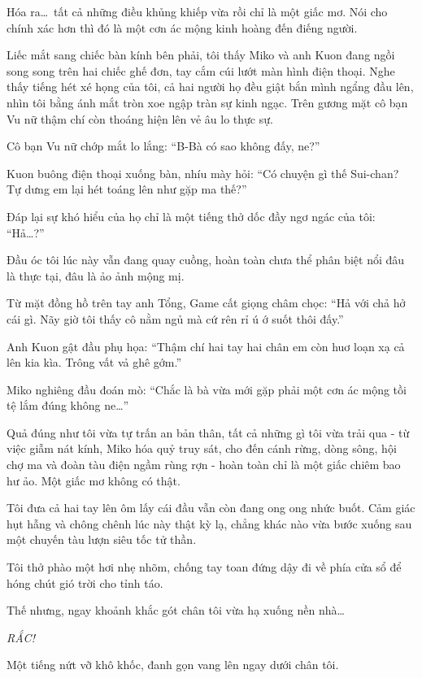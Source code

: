 \documentclass[../main.tex]{subfiles}
\begin{document}
Hóa ra\dots\ tất cả những điều khủng khiếp vừa rồi chỉ là một giấc mơ. Nói cho chính xác hơn thì đó là một cơn ác mộng kinh hoàng đến điếng người.

Liếc mắt sang chiếc bàn kính bên phải, tôi thấy Miko và anh Kuon đang ngồi song song trên hai chiếc ghế đơn, tay cắm cúi lướt màn hình điện thoại. Nghe thấy tiếng hét xé họng của tôi, cả hai người họ đều giật bắn mình ngẩng đầu lên, nhìn tôi bằng ánh mắt tròn xoe ngập tràn sự kinh ngạc. Trên gương mặt cô bạn Vu nữ thậm chí còn thoáng hiện lên vẻ âu lo thực sự.

Cô bạn Vu nữ chớp mắt lo lắng: ``B-Bà có sao không đấy, ne?''


Kuon buông điện thoại xuống bàn, nhíu mày hỏi: ``Có chuyện gì thế Sui-chan? Tự dưng em lại hét toáng lên như gặp ma thế?''

Đáp lại sự khó hiểu của họ chỉ là một tiếng thở dốc đầy ngơ ngác của tôi: ``Hả\dots?''

Đầu óc tôi lúc này vẫn đang quay cuồng, hoàn toàn chưa thể phân biệt nổi đâu là thực tại, đâu là ảo ảnh mộng mị.

Từ mặt đồng hồ trên tay anh Tổng, Game cất giọng châm chọc: ``Hả với chả hở cái gì. Nãy giờ tôi thấy cô nằm ngủ mà cứ rên rỉ ú ớ suốt thôi đấy.''

Anh Kuon gật đầu phụ họa: ``Thậm chí hai tay hai chân em còn huơ loạn xạ cả lên kia kìa. Trông vất vả ghê gớm.''

Miko nghiêng đầu đoán mò: ``Chắc là bà vừa mới gặp phải một cơn ác mộng tồi tệ lắm đúng không ne\dots''

Quả đúng như tôi vừa tự trấn an bản thân, tất cả những gì tôi vừa trải qua - từ việc giẫm nát kính, Miko hóa quỷ truy sát, cho đến cánh rừng, dòng sông, hội chợ ma và đoàn tàu điện ngầm rùng rợn - hoàn toàn chỉ là một giấc chiêm bao hư ảo. Một giấc mơ không có thật.

Tôi đưa cả hai tay lên ôm lấy cái đầu vẫn còn đang ong ong nhức buốt. Cảm giác hụt hẫng và chông chênh lúc này thật kỳ lạ, chẳng khác nào vừa bước xuống sau một chuyến tàu lượn siêu tốc tử thần.

Tôi thở phào một hơi nhẹ nhõm, chống tay toan đứng dậy đi về phía cửa sổ để hóng chút gió trời cho tỉnh táo.

Thế nhưng, ngay khoảnh khắc gót chân tôi vừa hạ xuống nền nhà\dots

\textit{RẮC!}

Một tiếng nứt vỡ khô khốc, đanh gọn vang lên ngay dưới chân tôi.
\end{document}
